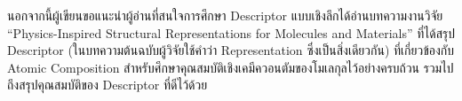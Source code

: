 นอกจากนี้ผู้เขียนขอแนะนำผู้อ่านที่สนใจการศึกษา Descriptor แบบเชิงลึกได้อ่านบทความงานวิจัย \enquote{Physics-Inspired Structural 
Representations for Molecules and Materials}\autocite{musil2021} ที่ได้สรุป Descriptor (ในบทความต้นฉบับผู้วิจัยใช้คำว่า 
Representation ซึ่งเป็นสิ่งเดียวกัน) ที่เกี่ยวข้องกับ Atomic Composition สำหรับศึกษาคุณสมบัติเชิงเคมีควอนตัมของโมเลกุลไว้อย่างครบถ้วน 
รวมไปถึงสรุปคุณสมบัติของ Descriptor ที่ดีไว้ด้วย
